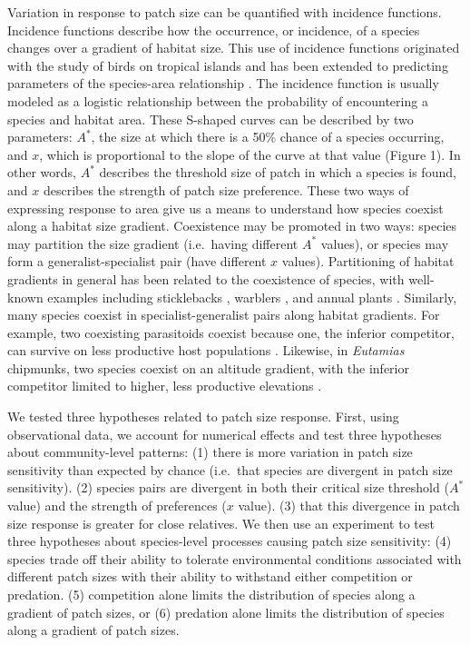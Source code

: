Variation in response to patch size can be quantified with incidence
functions. Incidence functions describe how the occurrence, or
incidence, of a species changes over a gradient of habitat size. This
use of incidence functions originated with the study of birds on
tropical islands \citep{Diamond1986} and has been extended to predicting
parameters of the species-area relationship \citep{Ovaskainen2003}. The
incidence function is usually modeled as a logistic relationship between
the probability of encountering a species and habitat area. These
S-shaped curves can be described by two parameters: \(A^{*}\), the size
at which there is a 50\% chance of a species occurring, and \(x\), which
is proportional to the slope of the curve at that value (Figure 1). In
other words, \(A^{*}\) describes the threshold size of patch in which a
species is found, and \(x\) describes the strength of patch size
preference. These two ways of expressing response to area give us a
means to understand how species coexist along a habitat size gradient.
Coexistence may be promoted in two ways: species may partition the size
gradient (i.e.~having different \(A^{*}\) values), or species may form a
generalist-specialist pair (have different \(x\) values). Partitioning
of habitat gradients in general has been related to the coexistence of
species, with well-known examples including sticklebacks
\citep{Rundle2000}, warblers \citep{MacArthur1958}, and annual plants
\citep{Seabloom2003}. Similarly, many species coexist in
specialist-generalist pairs along habitat gradients. For example, two
coexisting parasitoids coexist because one, the inferior competitor, can
survive on less productive host populations \citep{Amarasekare2000}.
Likewise, in \emph{Eutamias} chipmunks, two species coexist on an
altitude gradient, with the inferior competitor limited to higher, less
productive elevations \citep{Sheppard1971}.

We tested three hypotheses related to patch size response. First, using
observational data, we account for numerical effects and test three
hypotheses about community-level patterns: (1) there is more variation
in patch size sensitivity than expected by chance (i.e.~that species are
divergent in patch size sensitivity). (2) species pairs are divergent in
both their critical size threshold (\(A^{*}\) value) and the strength of
preferences (\(x\) value). (3) that this divergence in patch size
response is greater for close relatives. We then use an experiment to
test three hypotheses about species-level processes causing patch size
sensitivity: (4) species trade off their ability to tolerate
environmental conditions associated with different patch sizes with
their ability to withstand either competition or predation. (5)
competition alone limits the distribution of species along a gradient of
patch sizes, or (6) predation alone limits the distribution of species
along a gradient of patch sizes.

